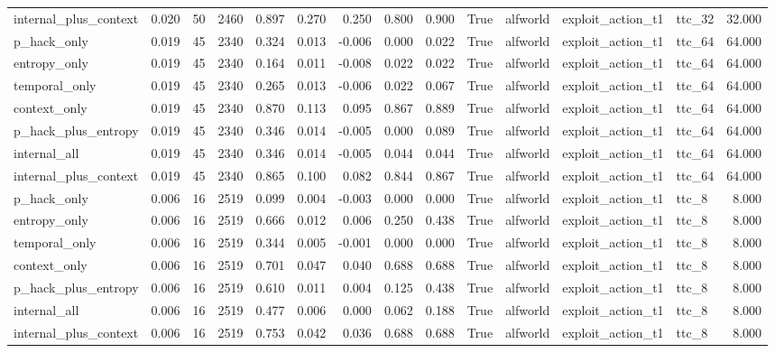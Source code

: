 \begin{tabular}{lrrrrrrrrrlllr}
internal_plus_context & 0.020 & 50 & 2460 & 0.897 & 0.270 & 0.250 & 0.800 & 0.900 & True & alfworld & exploit_action_t1 & ttc_32 & 32.000 \\
p_hack_only & 0.019 & 45 & 2340 & 0.324 & 0.013 & -0.006 & 0.000 & 0.022 & True & alfworld & exploit_action_t1 & ttc_64 & 64.000 \\
entropy_only & 0.019 & 45 & 2340 & 0.164 & 0.011 & -0.008 & 0.022 & 0.022 & True & alfworld & exploit_action_t1 & ttc_64 & 64.000 \\
temporal_only & 0.019 & 45 & 2340 & 0.265 & 0.013 & -0.006 & 0.022 & 0.067 & True & alfworld & exploit_action_t1 & ttc_64 & 64.000 \\
context_only & 0.019 & 45 & 2340 & 0.870 & 0.113 & 0.095 & 0.867 & 0.889 & True & alfworld & exploit_action_t1 & ttc_64 & 64.000 \\
p_hack_plus_entropy & 0.019 & 45 & 2340 & 0.346 & 0.014 & -0.005 & 0.000 & 0.089 & True & alfworld & exploit_action_t1 & ttc_64 & 64.000 \\
internal_all & 0.019 & 45 & 2340 & 0.346 & 0.014 & -0.005 & 0.044 & 0.044 & True & alfworld & exploit_action_t1 & ttc_64 & 64.000 \\
internal_plus_context & 0.019 & 45 & 2340 & 0.865 & 0.100 & 0.082 & 0.844 & 0.867 & True & alfworld & exploit_action_t1 & ttc_64 & 64.000 \\
p_hack_only & 0.006 & 16 & 2519 & 0.099 & 0.004 & -0.003 & 0.000 & 0.000 & True & alfworld & exploit_action_t1 & ttc_8 & 8.000 \\
entropy_only & 0.006 & 16 & 2519 & 0.666 & 0.012 & 0.006 & 0.250 & 0.438 & True & alfworld & exploit_action_t1 & ttc_8 & 8.000 \\
temporal_only & 0.006 & 16 & 2519 & 0.344 & 0.005 & -0.001 & 0.000 & 0.000 & True & alfworld & exploit_action_t1 & ttc_8 & 8.000 \\
context_only & 0.006 & 16 & 2519 & 0.701 & 0.047 & 0.040 & 0.688 & 0.688 & True & alfworld & exploit_action_t1 & ttc_8 & 8.000 \\
p_hack_plus_entropy & 0.006 & 16 & 2519 & 0.610 & 0.011 & 0.004 & 0.125 & 0.438 & True & alfworld & exploit_action_t1 & ttc_8 & 8.000 \\
internal_all & 0.006 & 16 & 2519 & 0.477 & 0.006 & 0.000 & 0.062 & 0.188 & True & alfworld & exploit_action_t1 & ttc_8 & 8.000 \\
internal_plus_context & 0.006 & 16 & 2519 & 0.753 & 0.042 & 0.036 & 0.688 & 0.688 & True & alfworld & exploit_action_t1 & ttc_8 & 8.000 \\

\end{tabular}
